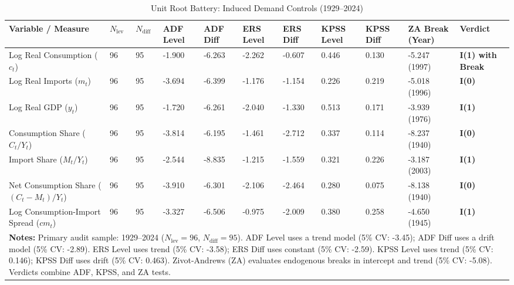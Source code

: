 \begin{table}[H]
\centering
\scriptsize
\caption{Unit Root Battery: Induced Demand Controls (1929--2024)}
\label{tab:urca_demand}
\begin{tabular}{p{5.5cm} p{0.5cm} p{0.5cm} p{1.3cm} p{1.3cm} p{1.3cm} p{1.3cm} p{1.3cm} p{1.3cm} p{2.2cm} p{2.2cm}}
\toprule
\textbf{Variable / Measure} & \textbf{$N_{\text{lev}}$} & \textbf{$N_{\text{diff}}$} & \textbf{ADF Level} & \textbf{ADF Diff} & \textbf{ERS Level} & \textbf{ERS Diff} & \textbf{KPSS Level} & \textbf{KPSS Diff} & \textbf{ZA Break (Year)} & \textbf{Verdict} \\
\midrule
Log Real Consumption ($c_t$) & 96 & 95 & -1.900 & -6.263 & -2.262 & -0.607 & 0.446 & 0.130 & -5.247 (1997) & \textbf{I(1) with Break} \\ 
Log Real Imports ($m_t$) & 96 & 95 & -3.694 & -6.399 & -1.176 & -1.154 & 0.226 & 0.219 & -5.018 (1996) & \textbf{I(0)} \\ 
Log Real GDP ($y_t$) & 96 & 95 & -1.720 & -6.261 & -2.040 & -1.330 & 0.513 & 0.171 & -3.939 (1976) & \textbf{I(1)} \\ 
Consumption Share ($C_t/Y_t$) & 96 & 95 & -3.814 & -6.195 & -1.461 & -2.712 & 0.337 & 0.114 & -8.237 (1940) & \textbf{I(0)} \\ 
Import Share ($M_t/Y_t$) & 96 & 95 & -2.544 & -8.835 & -1.215 & -1.559 & 0.321 & 0.226 & -3.187 (2003) & \textbf{I(1)} \\ 
Net Consumption Share ($(C_t - M_t)/Y_t$) & 96 & 95 & -3.910 & -6.301 & -2.106 & -2.464 & 0.280 & 0.075 & -8.138 (1940) & \textbf{I(0)} \\ 
Log Consumption-Import Spread ($cm_t$) & 96 & 95 & -3.327 & -6.506 & -0.975 & -2.009 & 0.380 & 0.258 & -4.650 (1945) & \textbf{I(1)} \\ 
\bottomrule
\multicolumn{11}{p{21.5cm}}{\footnotesize \textbf{Notes:} Primary audit sample: 1929--2024 ($N_{\text{lev}}=96$, $N_{\text{diff}}=95$). ADF Level uses a trend model (5\% CV: -3.45); ADF Diff uses a drift model (5\% CV: -2.89). ERS Level uses trend (5\% CV: -3.58); ERS Diff uses constant (5\% CV: -2.59). KPSS Level uses trend (5\% CV: 0.146); KPSS Diff uses drift (5\% CV: 0.463). Zivot-Andrews (ZA) evaluates endogenous breaks in intercept and trend (5\% CV: -5.08). Verdicts combine ADF, KPSS, and ZA tests.}
\end{tabular}
\end{table}
